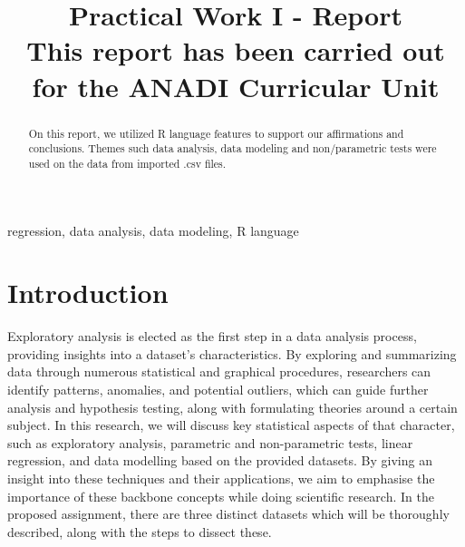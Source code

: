 \documentclass[conference]{IEEEtran}
\begin{document}
\title{Practical Work I - Report\\
{\footnotesize \textsuperscript{}This report has been carried out for the ANADI Curricular Unit}
}

\author{
\and

\and

}

\maketitle

\begin{abstract}
On this report, we utilized R language features to support our affirmations and conclusions.
Themes such data analysis, data modeling and non/parametric tests were used on the data
from imported .csv files. 
\end{abstract}

\begin{IEEEkeywords}
regression, data analysis, data modeling, R language
\end{IEEEkeywords}

\section{Introduction}

Exploratory analysis is elected as the first step in a data analysis process, providing insights into a dataset's characteristics. By exploring and summarizing data through numerous statistical and graphical procedures, 
researchers can identify patterns, anomalies, and potential outliers, which can guide further analysis and hypothesis testing, along with formulating theories around a certain subject.
In this research, we will discuss key statistical aspects of that character, such as exploratory analysis, parametric and non-parametric tests, linear regression, and data modelling based on the provided datasets.
By giving an insight into these techniques and their applications, we aim to emphasise the importance of these backbone concepts while doing scientific research.
In the proposed assignment, there are three distinct datasets which will be thoroughly described, along with the steps to dissect these.
\end{document}
